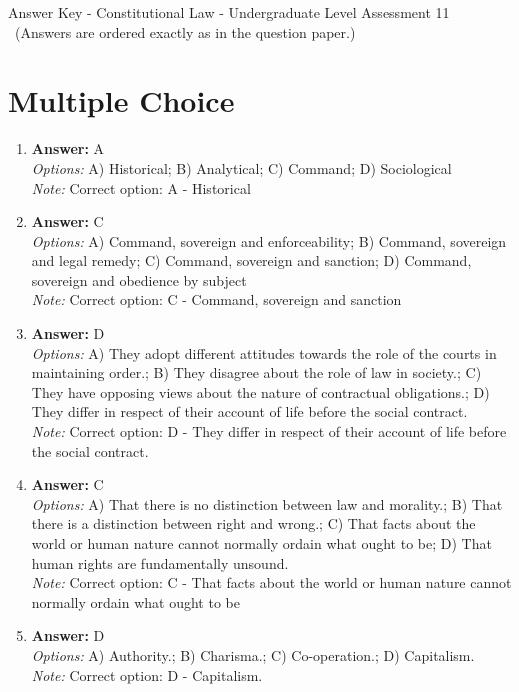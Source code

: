 \documentclass[12pt]{article}
\begin{document}
\begin{center}
Answer Key - Constitutional Law - Undergraduate Level Assessment 11 \
\small (Answers are ordered exactly as in the question paper.)
\end{center}

\section*{Multiple Choice}
\begin{enumerate}[label=\arabic*.]
\item \textbf{Answer:} A
\\ \textit{Options:} A) Historical; B) Analytical; C) Command; D) Sociological
\\ \textit{Note:} Correct option: A - Historical
\item \textbf{Answer:} C
\\ \textit{Options:} A) Command, sovereign and enforceability; B) Command, sovereign and legal remedy; C) Command, sovereign and sanction; D) Command, sovereign and obedience by subject
\\ \textit{Note:} Correct option: C - Command, sovereign and sanction
\item \textbf{Answer:} D
\\ \textit{Options:} A) They adopt different attitudes towards the role of the courts in maintaining order.; B) They disagree about the role of law in society.; C) They have opposing views about the nature of contractual obligations.; D) They differ in respect of their account of life before the social contract.
\\ \textit{Note:} Correct option: D - They differ in respect of their account of life before the social contract.
\item \textbf{Answer:} C
\\ \textit{Options:} A) That there is no distinction between law and morality.; B) That there is a distinction between right and wrong.; C) That facts about the world or human nature cannot normally ordain what ought to be; D) That human rights are fundamentally unsound.
\\ \textit{Note:} Correct option: C - That facts about the world or human nature cannot normally ordain what ought to be
\item \textbf{Answer:} D
\\ \textit{Options:} A) Authority.; B) Charisma.; C) Co-operation.; D) Capitalism.
\\ \textit{Note:} Correct option: D - Capitalism.
\end{enumerate}
\end{document}
